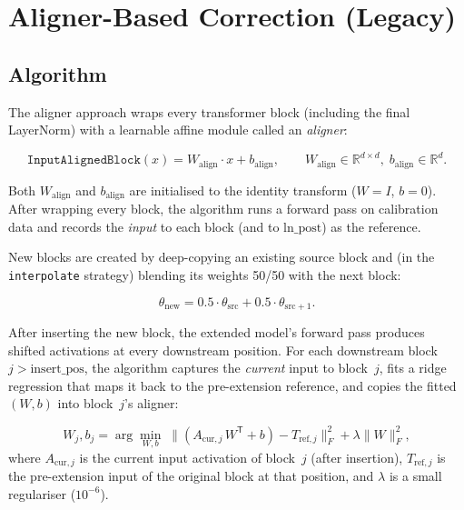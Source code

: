 \documentclass[11pt,a4paper]{article}
\begin{document}
\section{Aligner-Based Correction (Legacy)}
\label{sec:aligner}

\subsection{Algorithm}
\label{subsec:aligner_algo}

The aligner approach wraps every transformer block (including the final
LayerNorm) with a learnable affine module called an \emph{aligner}:

\begin{equation}
    \texttt{InputAlignedBlock}(x) = W_{\text{align}} \cdot x + b_{\text{align}},
    \qquad
    W_{\text{align}} \in \mathbb{R}^{d \times d},\;
    b_{\text{align}} \in \mathbb{R}^{d}.
\end{equation}

Both $W_{\text{align}}$ and $b_{\text{align}}$ are initialised to the identity
transform ($W = I$, $b = 0$). After wrapping every block, the algorithm runs
a forward pass on calibration data and records the \emph{input} to each block
(and to $\text{ln\_post}$) as the reference.

New blocks are created by deep-copying an existing source block and (in the
\texttt{interpolate} strategy) blending its weights 50/50 with the next block:

\begin{equation}
    \theta_{\text{new}} = 0.5 \cdot \theta_{\text{src}} + 0.5 \cdot \theta_{\text{src}+1}.
\end{equation}

After inserting the new block, the extended model's forward pass produces
shifted activations at every downstream position. For each downstream block
$j > \text{insert\_pos}$, the algorithm captures the \emph{current} input to
block~$j$, fits a ridge regression that maps it back to the pre-extension
reference, and copies the fitted $(W, b)$ into block~$j$'s aligner:

\begin{equation}
    W_j, b_j = \arg\min_{W,b} \;
    \bigl\| (A_{\text{cur},j} \, W^{\mathsf{T}} + b) - T_{\text{ref},j} \bigr\|_F^2
    + \lambda \|W\|_F^2,
\end{equation}
where $A_{\text{cur},j}$ is the current input activation of block~$j$ (after
insertion), $T_{\text{ref},j}$ is the pre-extension input of the original
block at that position, and $\lambda$ is a small regulariser ($10^{-6}$).
\end{document}
